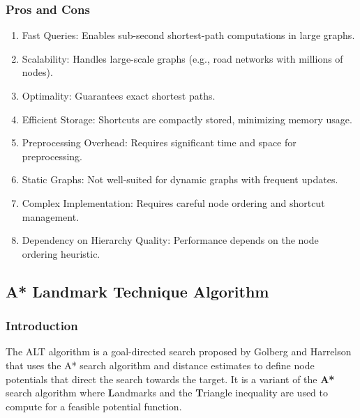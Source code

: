 	\subsubsection{Pros and Cons}
	\begin{enumerate}
		\item Fast Queries: Enables sub-second shortest-path computations in large graphs.  
		\item Scalability: Handles large-scale graphs (e.g., road networks with millions of nodes).
		\item  Optimality: Guarantees exact shortest paths.
		\item Efficient Storage: Shortcuts are compactly stored, minimizing memory usage.\\
		
		\item Preprocessing Overhead: Requires significant time and space for preprocessing. 
		\item Static Graphs: Not well-suited for dynamic graphs with frequent updates. 
		\item Complex Implementation: Requires careful node ordering and shortcut management. 
		\item Dependency on Hierarchy Quality: Performance depends on the node ordering heuristic.
		
	\end{enumerate}
	\subsection{A* Landmark Technique Algorithm}
		\subsubsection{Introduction}
			The ALT algorithm is a goal-directed search proposed by Golberg and Harrelson that uses the A* search algorithm and distance estimates to define node potentials that direct the search towards the target.
			It is a variant of the \textbf{A*} search algorithm where \textbf{L}andmarks and the \textbf{T}riangle inequality are used to compute for a feasible potential function. 
